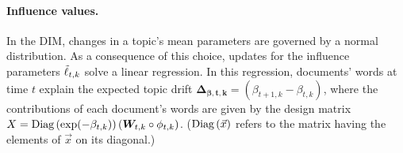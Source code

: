 \paragraph{Influence values.}
In the DIM, changes in a topic's mean parameters are governed by a
normal distribution.  As a consequence of this choice, updates for the
influence parameters $\tilde{\ell}_{t,k}$ solve a linear regression.  In this
regression, documents' words at time $t$ explain the expected topic
drift $\bm{\Delta_{\beta,t,k}} = (\beta_{t+1,k} - \beta_{t,k})$, where
the contributions of each document's words are given by the design
matrix $X = \mbox{Diag}\left( \exp(-\beta_{t,k}) \right) (\bm W_{t,k} \circ \phi_{t,k}
)$. ($\mbox{Diag}\left( \vec{x} \right)$ refers to the matrix having the elements of
$\vec{x}$ on its diagonal.)

